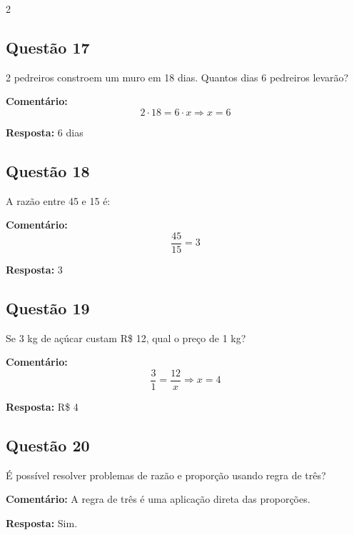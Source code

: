 \documentclass[11pt]{article}
\begin{document}
\begin{multicols}{2}
\subsection*{Questão 17}
2 pedreiros constroem um muro em 18 dias. Quantos dias 6 pedreiros levarão?

\textbf{Comentário:}
\[
2 \cdot 18 = 6 \cdot x \Rightarrow x = 6
\]

\textbf{Resposta:} 6 dias

\subsection*{Questão 18}
A razão entre 45 e 15 é:

\textbf{Comentário:}
\[
\frac{45}{15} = 3
\]

\textbf{Resposta:} 3

\subsection*{Questão 19}
Se 3 kg de açúcar custam R\$ 12, qual o preço de 1 kg?

\textbf{Comentário:}
\[
\frac{3}{1} = \frac{12}{x} \Rightarrow x = 4
\]

\textbf{Resposta:} R\$ 4

\subsection*{Questão 20}
É possível resolver problemas de razão e proporção usando regra de três?

\textbf{Comentário:} A regra de três é uma aplicação direta das proporções.

\textbf{Resposta:} Sim.

\end{multicols}
\end{document}
